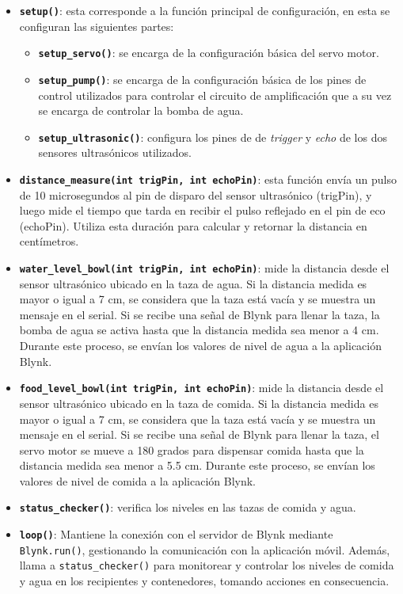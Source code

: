 \begin{itemize}
    \item \textbf{\texttt{setup()}}: esta corresponde a la función principal de configuración, en esta se configuran las siguientes partes: 
    \begin{itemize}
        \item \textbf{\texttt{setup\_servo()}}: se encarga de la configuración básica del servo motor. 
        \item \textbf{\texttt{setup\_pump()}}: se encarga de la configuración básica de los pines de control utilizados para controlar el circuito de amplificación que a su vez se encarga de controlar la bomba de agua.  
        \item \textbf{\texttt{setup\_ultrasonic()}}: configura los pines de de \textit{trigger} y \textit{echo} de los dos sensores ultrasónicos utilizados.  
    \end{itemize}

    \item \textbf{\texttt{distance\_measure(int trigPin, int echoPin)}}: esta función envía un pulso de 10 microsegundos al pin de disparo del sensor ultrasónico (trigPin), y luego mide el tiempo que tarda en recibir el pulso reflejado en el pin de eco (echoPin). Utiliza esta duración para calcular y retornar la distancia en centímetros.

    \item \textbf{\texttt{water\_level\_bowl(int trigPin, int echoPin)}}: mide la distancia desde el sensor ultrasónico ubicado en la taza de agua. Si la distancia medida es mayor o igual a 7 cm, se considera que la taza está vacía y se muestra un mensaje en el serial. Si se recibe una señal de Blynk para llenar la taza, la bomba de agua se activa hasta que la distancia medida sea menor a 4 cm. Durante este proceso, se envían los valores de nivel de agua a la aplicación Blynk.

    \item \textbf{\texttt{food\_level\_bowl(int trigPin, int echoPin)}}: mide la distancia desde el sensor ultrasónico ubicado en la taza de comida. Si la distancia medida es mayor o igual a 7 cm, se considera que la taza está vacía y se muestra un mensaje en el serial. Si se recibe una señal de Blynk para llenar la taza, el servo motor se mueve a 180 grados para dispensar comida hasta que la distancia medida sea menor a 5.5 cm. Durante este proceso, se envían los valores de nivel de comida a la aplicación Blynk.

    \item \textbf{\texttt{status\_checker()}}: verifica los niveles en las tazas de comida y agua. 

    \item \textbf{\texttt{loop()}}: Mantiene la conexión con el servidor de Blynk mediante \texttt{Blynk.run()}, gestionando la comunicación con la aplicación móvil. Además, llama a \texttt{status\_checker()} para monitorear y controlar los niveles de comida y agua en los recipientes y contenedores, tomando acciones en consecuencia.
\end{itemize}

